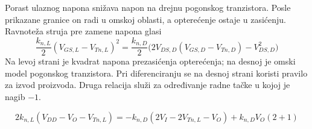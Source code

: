 Porast ulaznog napona snižava napon na drejnu pogonskog tranzistora. Posle prikazane granice on radi u omskoj oblasti, a opterećenje ostaje u zasićenju. Ravnoteža struja pre zamene napona glasi
\[\frac{k_{n,L}}2(V_{GS,L}-V_{Tn,L})^2=\frac{k_{n,D}}2\bigl(2V_{DS,D}(V_{GS,D}-V_{Tn,D})-V_{DS,D}^2\bigr)\]
Na levoj strani je kvadrat napona prezasićenja opterećenja; na desnoj je omski model pogonskog tranzistora. Pri diferenciranju se na desnoj strani koristi pravilo za izvod proizvoda. Druga relacija služi za određivanje radne tačke u kojoj je nagib $-1$.

\[2k_{n,L}(V_{DD}-V_O-V_{Tn,L})=-k_{n,D}(2V_I-2V_{Tn,L}-V_O)+k_{n,D}V_O(2+1)\]

